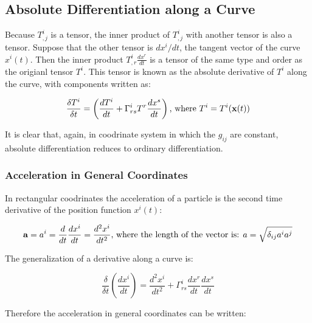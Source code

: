 \documentclass{article}
\begin{document}
\subsection{Absolute Differentiation along a Curve}

Because $T^i_{,j}$ is a tensor, the inner product of $T^i_{,j}$ with another tensor is also a tensor.  Suppose that the other tensor is $dx^i / dt$, the tangent vector of the curve $x^i( t )$.  
Then the inner product $T^i_{,r} \frac{ dx^r }{ dt }$ is a tensor of the same type and order as the origianl tensor $T^i$.  This tensor is known as the absolute derivative of $T^i$ along the curve, with components written as:

\begin{equation}
	\frac{ \delta T^i }{ \delta t } = \left( \frac{ dT^i }{ dt } + \Gamma^i_{rs} T^r \frac{ dx^s }{ dt } \right)\\
	\text{, where }\\
	T^i = T^i( \mathbf{ x }(t) )
\end{equation}

It is clear that, again, in coodrinate system in which the $g_{ij}$ are constant, absolute differentiation reduces to ordinary differentiation.


\subsubsection{Acceleration in General Coordinates}

In rectangular coodrinates the acceleration of a particle is the second time derivative of the position function $x^i(t)$:

\begin{equation*}
	\mathbf{ a } = a^i = \frac{ d }{ dt } \frac{ dx^i }{ dt } = \frac{ d^2 x^i }{ dt^2 }\\
	\text{, where the length of the vector is: }\\
	a = \sqrt{ \delta_{ij} a^i a^j }
\end{equation*}

The generalization of a derivative along a curve is:

\begin{equation*}
	\frac{ \delta }{ \delta t } \left( \frac{ dx^i }{ dt } \right) = \frac{ d^2 x^i }{ dt^2 } + \Gamma^i_{rs} \frac{ dx^r }{ dt } \frac{ dx^s }{ dt }
\end{equation*}

Therefore the acceleration in general coordinates can be written:
\end{document}
